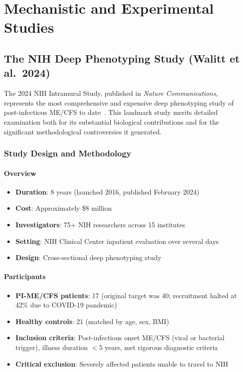 \chapter{Mechanistic and Experimental Studies}
\label{ch:mechanistic-studies}

\section{The NIH Deep Phenotyping Study (Walitt et al.\ 2024)}
\label{sec:nih-deep-phenotyping}

The 2024 NIH Intramural Study, published in \textit{Nature Communications}, represents the most comprehensive and expensive deep phenotyping study of post-infectious ME/CFS to date~\cite{walitt2024deep}. This landmark study merits detailed examination both for its substantial biological contributions and for the significant methodological controversies it generated.

\subsection{Study Design and Methodology}

\subsubsection{Overview}
\begin{itemize}
    \item \textbf{Duration}: 8 years (launched 2016, published February 2024)
    \item \textbf{Cost}: Approximately \$8 million
    \item \textbf{Investigators}: 75+ NIH researchers across 15 institutes
    \item \textbf{Setting}: NIH Clinical Center inpatient evaluation over several days
    \item \textbf{Design}: Cross-sectional deep phenotyping study
\end{itemize}

\subsubsection{Participants}
\begin{itemize}
    \item \textbf{PI-ME/CFS patients}: 17 (original target was 40; recruitment halted at 42\% due to COVID-19 pandemic)
    \item \textbf{Healthy controls}: 21 (matched by age, sex, BMI)
    \item \textbf{Inclusion criteria}: Post-infectious onset ME/CFS (viral or bacterial trigger), illness duration $<$5 years, met rigorous diagnostic criteria
    \item \textbf{Critical exclusion}: Severely affected patients unable to travel to NIH
\end{itemize}

